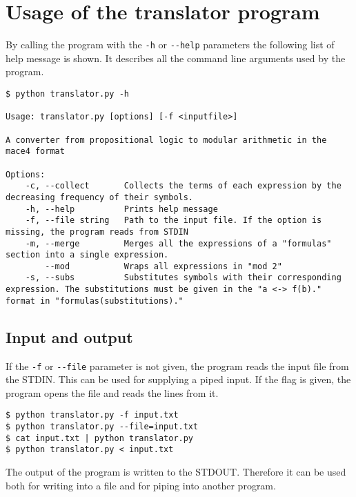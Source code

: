 \section{Usage of the translator program}

By calling the program with the \verb|-h| or \verb|--help| parameters the following list of help message is shown. It describes all the command line arguments used by the program.

\begin{lstlisting}[numbers=none,caption=Help message of the program]
$ python translator.py -h

Usage: translator.py [options] [-f <inputfile>]

A converter from propositional logic to modular arithmetic in the mace4 format

Options:
    -c, --collect       Collects the terms of each expression by the decreasing frequency of their symbols.
    -h, --help          Prints help message
    -f, --file string   Path to the input file. If the option is missing, the program reads from STDIN 
    -m, --merge         Merges all the expressions of a "formulas" section into a single expression.
        --mod           Wraps all expressions in "mod 2"
    -s, --subs          Substitutes symbols with their corresponding expression. The substitutions must be given in the "a <-> f(b)." format in "formulas(substitutions)."

\end{lstlisting}



\subsection{Input and output}

If the \verb|-f| or \verb|--file| parameter is not given, the program reads the input file from the STDIN. This can be used for supplying a piped input. If the flag is given, the program opens the file and reads the lines from it.

\begin{lstlisting}[numbers=none, caption=The possible ways of supplying the input to the program]
$ python translator.py -f input.txt
$ python translator.py --file=input.txt
$ cat input.txt | python translator.py
$ python translator.py < input.txt
\end{lstlisting}

The output of the program is written to the STDOUT. Therefore it can be used both for writing into a file and for piping into another program.

